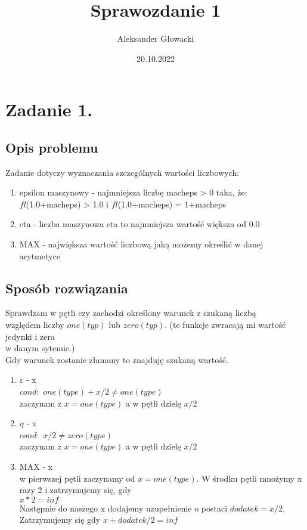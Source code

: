 \documentclass[12pt]{article}
\author{Aleksander Głowacki}
\title{Sprawozdanie 1}
\date{20.10.2022}
\begin{document}
\maketitle

\tableofcontents

\section{Zadanie 1.}


\subsection{Opis problemu}
Zadanie dotyczy wyznaczania szczególnych wartości liczbowych:
\begin{enumerate}
    \item epsilon maszynowy - 
    najmniejsza liczbę macheps > 0 taka, że: \\
     $f l$(1.0+macheps) > 1.0 i $f l$(1.0+macheps) = 1+macheps
    \item eta - liczba maszynowa eta to najmniejsza wartość większa od 0.0
    \item MAX - największa wartość liczbową jaką możemy określić w danej arytmetyce
  \end{enumerate}
\subsection{Sposób rozwiązania}
Sprawdzam w pętli czy zachodzi określony warunek z szukaną liczbą\\
względem liczby $one(typ)$ lub $zero(typ)$. 
(te funkcje zwracają mi wartość jedynki i zera \\
w danym sytemie.) \\Gdy warunek zostanie złamany to znajduję szukaną wartość.
\begin{enumerate}
    \item $\varepsilon$ - x \\ $cond:$ $one(type) + x/2 \neq one(type)$ 
    \\ zaczynam z $x = one(type)$ a  w pętli dzielę $x/2$
    \item $\eta$ - x \\ $cond:$ $x/2 \neq zero(type)$ \\ 
    zaczynam z $x = one(type)$ a  w pętli dzielę $x/2$ 
    \item $\text{MAX}$ - x \\ w pierwszej pętli zaczynamy od 
    $x = one(type)$. W środku pętli mnożymy x razy 2 i zatrzymujemy się, gdy\\ $x*2 = inf$\\
    Następnie do naszego x dodajemy uzupełnienie o postaci $dodatek = x/2$.\\
    Zatrzymujemy się gdy $x + dodatek/2 = inf$
\end{enumerate}
\newpage
\end{document}
